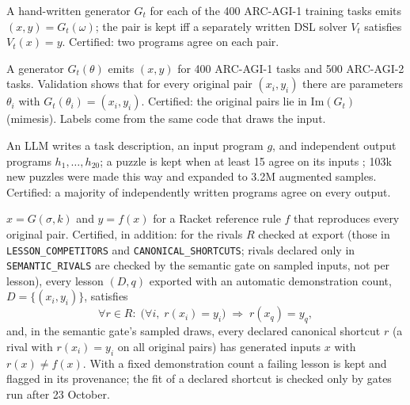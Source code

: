 \documentclass[11pt]{article}
\begin{document}
\begin{description}[nosep,leftmargin=1.5em]
  \item[RE-ARC \cite{rearc}.] A hand-written generator $G_t$ for each of the 400
  ARC-AGI-1 training tasks emits $(x,y)=G_t(\omega)$; the pair is kept iff a
  separately written DSL solver $V_t$ satisfies $V_t(x)=y$. Certified: two
  programs agree on each pair.
  \item[ARC-GEN \cite{arcgen}.] A generator $G_t(\theta)$ emits $(x,y)$ for 400
  ARC-AGI-1 tasks and 500 ARC-AGI-2 tasks. Validation shows that for every
  original pair $(x_i,y_i)$ there are parameters $\theta_i$ with
  $G_t(\theta_i)=(x_i,y_i)$. Certified: the original pairs lie in
  $\mathrm{Im}(G_t)$ (mimesis). Labels come from the same code that draws the
  input.
  \item[NVARC \cite{nvarc}.] An LLM writes a task description, an input program
  $g$, and independent output programs $h_1,\dots,h_{20}$; a puzzle is kept when
  at least 15 agree on its inputs \cite{darragh2026}; 103k new puzzles were
  made this way and expanded to 3.2M augmented samples. Certified: a majority of
  independently written programs agree on every output.
  \item[ARCpuzzles.] $x=G(\sigma,k)$ and $y=f(x)$ for a Racket reference rule $f$
  that reproduces every original pair. Certified, in addition: for the rivals
  $R$ checked at export (those in \texttt{LESSON\_COMPETITORS} and
  \texttt{CANONICAL\_SHORTCUTS}; rivals declared only in
  \texttt{SEMANTIC\_RIVALS} are checked by the semantic gate on sampled inputs,
  not per lesson), every lesson $(D,q)$ exported with an automatic demonstration count, $D=\{(x_i,y_i)\}$, satisfies
  \[
    \forall r\in R:\; \big(\forall i,\; r(x_i)=y_i\big) \;\Rightarrow\; r(x_q)=y_q,
  \]
  and, in the semantic gate's sampled draws, every declared canonical shortcut
  $r$ (a rival with $r(x_i)=y_i$ on all original pairs) has generated inputs $x$
  with $r(x)\neq f(x)$. With a fixed
  demonstration count a failing lesson is kept and flagged in its provenance;
  the fit of a declared shortcut is checked only by gates run after 23 October.
\end{description}
\end{document}
